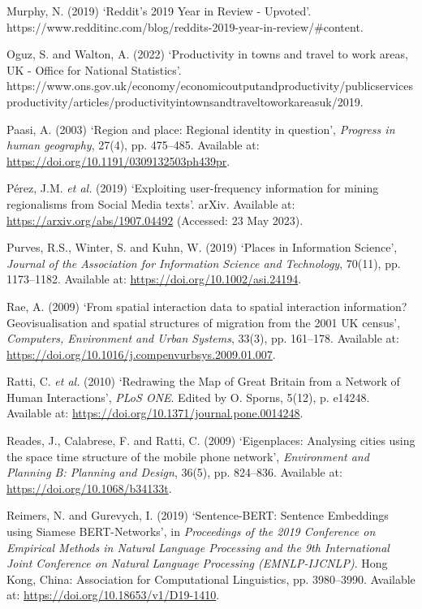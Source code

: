 \documentclass[
]{article}
\newlength{\cslhangindent}
\newenvironment{CSLReferences}[2] %
 {\begin{list}{}{%
  \setlength{\itemindent}{0pt}
  \setlength{\leftmargin}{0pt}
  \setlength{\parsep}{0pt}
  \ifodd #1
   \setlength{\leftmargin}{\cslhangindent}
   \setlength{\itemindent}{-1\cslhangindent}
  \fi
  \setlength{\itemsep}{#2\baselineskip}}}
 {\end{list}}
\begin{document}
\begin{CSLReferences}{0}{1}
Murphy, N. (2019) {`Reddit's 2019 {Year} in {Review} - {Upvoted}'}.
https://www.redditinc.com/blog/reddits-2019-year-in-review/\#content.

Oguz, S. and Walton, A. (2022) {`Productivity in towns and travel to
work areas, {UK} - {Office} for {National Statistics}'}.
https://www.ons.gov.uk/economy/economicoutputandproductivity/publicservicesproductivity/articles/productivityintownsandtraveltoworkareasuk/2019.

Paasi, A. (2003) {`Region and place: Regional identity in question'},
\emph{Progress in human geography}, 27(4), pp. 475--485. Available at:
\url{https://doi.org/10.1191/0309132503ph439pr}.

Pérez, J.M. \emph{et al.} (2019) {`Exploiting user-frequency information
for mining regionalisms from {Social Media} texts'}. {arXiv}. Available
at: \url{https://arxiv.org/abs/1907.04492} (Accessed: 23 May 2023).

Purves, R.S., Winter, S. and Kuhn, W. (2019) {`Places in {Information
Science}'}, \emph{Journal of the Association for Information Science and
Technology}, 70(11), pp. 1173--1182. Available at:
\url{https://doi.org/10.1002/asi.24194}.

Rae, A. (2009) {`From spatial interaction data to spatial interaction
information? {Geovisualisation} and spatial structures of migration from
the 2001 {UK} census'}, \emph{Computers, Environment and Urban Systems},
33(3), pp. 161--178. Available at:
\url{https://doi.org/10.1016/j.compenvurbsys.2009.01.007}.

Ratti, C. \emph{et al.} (2010) {`Redrawing the {Map} of {Great Britain}
from a {Network} of {Human Interactions}'}, \emph{PLoS ONE}. Edited by
O. Sporns, 5(12), p. e14248. Available at:
\url{https://doi.org/10.1371/journal.pone.0014248}.

Reades, J., Calabrese, F. and Ratti, C. (2009) {`Eigenplaces: Analysing
cities using the space {\textendash} time structure of the mobile phone
network'}, \emph{Environment and Planning B: Planning and Design},
36(5), pp. 824--836. Available at:
\url{https://doi.org/10.1068/b34133t}.

Reimers, N. and Gurevych, I. (2019) {`Sentence-{BERT}: {Sentence
Embeddings} using {Siamese BERT-Networks}'}, in \emph{Proceedings of the
2019 {Conference} on {Empirical Methods} in {Natural Language
Processing} and the 9th {International Joint Conference} on {Natural
Language Processing} ({EMNLP-IJCNLP})}. {Hong Kong, China}: {Association
for Computational Linguistics}, pp. 3980--3990. Available at:
\url{https://doi.org/10.18653/v1/D19-1410}.


\end{CSLReferences}
\end{document}
